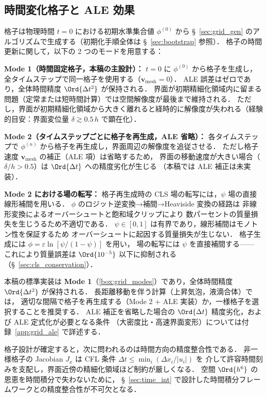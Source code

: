 
\subsection{時間変化格子と ALE 効果}
\label{sec:grid_ale}

格子は物理時間 $t=0$ における初期水準集合値 $\phi^{(0)}$ から
§~\ref{sec:grid_gen} のアルゴリズムで生成する（初期化手順全体は §~\ref{sec:bootstrap} 参照）．
格子の時間更新に関して，以下の 2 つのモードを用意する：

\begin{tcolorbox}[mybox, title={格子使用モードの選択}]
\label{box:grid_modes}
\textbf{Mode 1（時間固定格子，本稿の主設計）：}
$t=0$ に $\phi^{(0)}$ から格子を生成し，全タイムステップで同一格子を使用する（$\bm{v}_\text{mesh}=0$）．
ALE 誤差はゼロであり，全体時間精度 $\Ord{\Delta t^2}$ が保持される．
界面が初期精細化領域内に留まる問題（定常または短時間計算）では空間解像度が最後まで維持される．
ただし，界面が初期精細化領域から大きく離れると経時的に解像度が失われる（経験的目安：界面変位量 $\delta \gtrsim 0.5\,h$ で顕在化）．

\textbf{Mode 2（タイムステップごとに格子を再生成，ALE 省略）：}
各タイムステップで $\phi^{(n)}$ から格子を再生成し，界面周辺の解像度を追従させる．
ただし格子速度 $\bm{v}_\text{mesh}$ の補正（ALE 項）は省略するため，
界面の移動速度が大きい場合（$\delta/h > 0.5$）は $\Ord{\Delta t}$ への精度劣化が生じる
（本稿では ALE 補正は未実装）．

\textbf{Mode 2 における場の転写：}
格子再生成時の CLS 場の転写には，$\psi$ 場の直接線形補間を用いる．
$\phi$ のロジット逆変換→補間→Heaviside 変換の経路は
非線形変換によるオーバーシュートと飽和域クリップにより
数パーセントの質量損失を生じうるため不適切である．
$\psi \in [0,1]$ は有界であり，線形補間はモノトン性を保証するため
オーバーシュートに起因する質量損失が生じない．
格子生成には $\phi = \varepsilon\ln[\psi/(1-\psi)]$ を用い，
場の転写には $\psi$ を直接補間する——
これにより質量誤差は $\Ord{10^{-5}}$ 以下に抑制される
（§~\ref{sec:cls_conservation}）．
\end{tcolorbox}

本稿の標準実装は \textbf{Mode 1}（\ref{box:grid_modes}）であり，全体時間精度 $\Ord{\Delta t^2}$ が保持される．
長距離移動を伴う計算（上昇気泡，液滴合体）では，
適切な間隔で格子を再生成する（Mode 2 + ALE 実装）か，一様格子を選択することを推奨する．
ALE 補正を省略した場合の $\Ord{\Delta t}$ 精度劣化，および ALE 定式化が必要となる条件
（大密度比・高速界面変形）については付録~\ref{app:grid_ale} で詳述する．

格子設計が確定すると，次に問われるのは時間方向の精度整合性である．
非一様格子の Jacobian $J_x$ は CFL 条件 $\Delta t \le \min_i(\Delta x_i/|u_i|)$ を
介して許容時間刻みを支配し，界面近傍の精細化領域ほど制約が厳しくなる．
空間 $\Ord{h^6}$ の恩恵を時間積分で失わないために，
§~\ref{sec:time_int} で設計した時間積分フレームワークとの精度整合性が不可欠となる．
